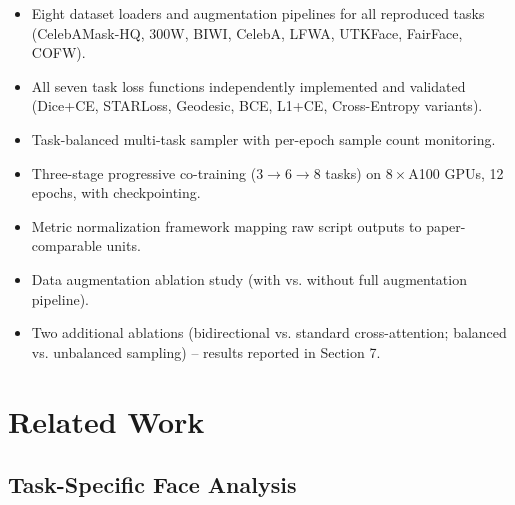 \documentclass[11pt]{article}
\begin{document}
\begin{itemize}\item Eight dataset loaders and augmentation pipelines for all reproduced tasks (CelebAMask-HQ, 300W, BIWI, CelebA, LFWA, UTKFace, FairFace, COFW).\end{itemize}

\begin{itemize}\item All seven task loss functions independently implemented and validated (Dice+CE, STARLoss, Geodesic, BCE, L1+CE, Cross-Entropy variants).\end{itemize}

\begin{itemize}\item Task-balanced multi-task sampler with per-epoch sample count monitoring.\end{itemize}

\begin{itemize}\item Three-stage progressive co-training ($3\rightarrow6\rightarrow8$ tasks) on $8\times$A100 GPUs, 12 epochs, with checkpointing.\end{itemize}

\begin{itemize}\item Metric normalization framework mapping raw script outputs to paper-comparable units.\end{itemize}

\begin{itemize}\item Data augmentation ablation study (with vs. without full augmentation pipeline).\end{itemize}

\begin{itemize}\item Two additional ablations (bidirectional vs. standard cross-attention; balanced vs. unbalanced sampling) -- results reported in Section 7.\end{itemize}



\section{Related Work}



\subsection{Task-Specific Face Analysis}
\end{document}
